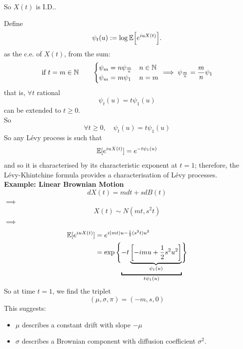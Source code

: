 \documentclass[class=article,crop=false]{standalone}
\begin{document}
So $X(t)$ is I.D..\par
Define 
\[\psi_t(u):=\log\mathbb{E}\Bigl[{e^{iuX(t)}}\Bigr].\]
as the c.e. of $X(t)$, from the sum:
\[\text{if }t=m\in\mathbb{N}\qquad\begin{cases}
	\psi_m=n\psi_{\frac{m}{n}} &n\in\mathbb{N}\\
	\psi_m=m\psi_1&n=m
\end{cases}\implies\psi_{\frac{m}{n}}=\frac{m}{n}\psi_1\]
that is, $\forall t$ rational 
\begin{equation*}
	\psi_t(u) = t \psi_1(u)
\end{equation*}
can be extended to $t \geqslant 0$. \\
So
\begin{equation*}
	\forall t \geqslant 0, \quad \psi_t(u) = t \psi_1(u)
\end{equation*}
So any L\'evy process is such that 
\begin{equation*}
	\mathbb{E}[e^{i u X(t)}] = e^{- t \psi_1(u)}
\end{equation*}
and so it is characterised by its characteristic exponent at $t=1$; therefore, the L\'evy-Khintchine formula provides a characterisation of L\'evy processes.\\
\textbf{Example: Linear Brownian Motion}\\
\begin{equation*}
	d X(t) = m dt + s dB(t)
\end{equation*}
$\implies$
\begin{equation*}
	X(t) \sim N(mt, s^2 t)
\end{equation*}
$\implies$
\begin{align*}
	\mE[e^{i u X(t)}] &= e^{i (mt) u - \frac{1}{2}(s^2 t) u^2}\\
	&= \exp\Bigg\{{\underbracket{-t\underbrace{\left[-imu + \frac{1}{2}s^2 u^2\right]}_{\psi_1(u)}}_{t \psi_1(u)}}\Bigg\}
\end{align*}
So at time $t = 1$, we find the triplet 
\begin{equation*}
	(\mu, \sigma, \pi) = (-m, s,0)
\end{equation*}
This suggests:
\begin{itemize}
	\item $\mu$ describes a constant drift with slope $ -\mu$
	\item $\sigma$ describes a Brownian component with diffusion coefficient $\sigma^2$. 
\end{itemize}
\end{document}
